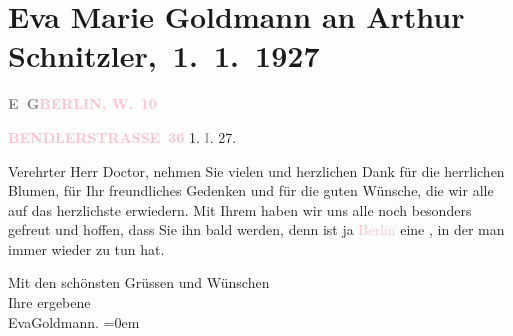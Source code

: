 

\renewcommand{\erwaehntePersonen}{Personen: Paul Goldmann, Franziska Goldmann}
\renewcommand{\erwaehnteOrte}{Orte: Bendlerstraße, Berlin}
\renewcommand{\erwaehnteWerke}{}
\section[ Eva Marie Goldmann an Arthur Schnitzler, 1. 1. 1927]{Eva Marie Goldmann an Arthur Schnitzler, 1. 1. 1927}
\nopagebreak{}
\rehead{ }\normalsize\beginnumbering{}
\toendnotes[C]{\smallbreak\pagebreak[2]}
\toendnotes[C]{\smallbreak}
\pstart
           \noindent{}\textcolor{gray}{\textbf{E G}}\hfill {\pb}\textcolor{gray}{\textbf{\textcolor{pink}{BERLIN, W. 10}{}\ledrightnote{\textcolor{pink}{Berlin}}}}\pend
           
\pstart
           \raggedleft{}\textcolor{gray}{\textbf{\textcolor{pink}{BENDLERSTRASSE 36}{}\ledrightnote{\textcolor{pink}{Bendlerstraße}}}}{ }1. \textcolor{gray}{I}. 27.
               \pend
           
\pstart{}Verehrter Herr Doctor,\pend
\pstart
           nehmen Sie vielen und herzlichen Dank für die herrlichen Blumen, für Ihr freundliches
               Gedenken und für die guten Wünsche, die wir alle auf das herzlichste erwiedern. {\pb}Mit Ihrem \label{K_L03542-1v}\label{K_L03542-1h} haben wir uns alle noch besonders gefreut und hoffen, dass Sie ihn bald
                  \label{K_L03542-2v}\label{K_L03542-2h} werden, denn \label{K_L03542-3v}\label{K_L03542-3h} ist ja \textcolor{pink}{Berlin}{}\ledrightnote{\textcolor{pink}{Berlin}} eine \label{T_L03542-1v}\label{T_L03542-1h}, in der man immer wieder zu tun hat.\pend
           
\pstart
           Mit den schönsten Grüssen und Wünschen{\\[\baselineskip]} Ihre ergebene {\\[\baselineskip]}\spacefill\mbox{EvaGoldmann.}\pend
           \leftskip=0em{}\endnumbering{}  
      